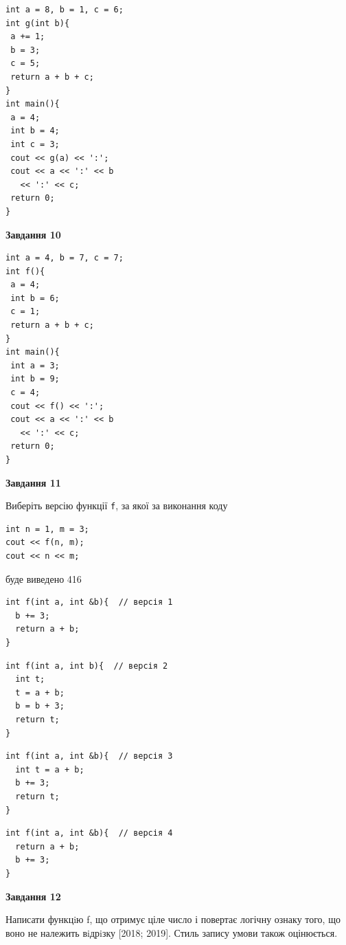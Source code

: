\documentclass[12pt, ukrainian]{article}
\def\code#1{\Verb!#1!}
\begin{document}
{\begin {large}
\begin{minipage}[t]{7.0cm}
\begin{verbatim}
int a = 8, b = 1, c = 6;
int g(int b){
 a += 1;
 b = 3;
 c = 5;
 return a + b + c;
}
int main(){
 a = 4;
 int b = 4;
 int c = 3;
 cout << g(a) << ':';
 cout << a << ':' << b 
   << ':' << c;
 return 0;
}
\end{verbatim}



\begin{center}
\textbf{Завдання 10}
\end{center}
\vspace{-8mm}

\begin{verbatim}
int a = 4, b = 7, c = 7;
int f(){
 a = 4;
 int b = 6;
 c = 1;
 return a + b + c;
}
int main(){
 int a = 3;
 int b = 9;
 c = 4;
 cout << f() << ':';
 cout << a << ':' << b 
   << ':' << c;
 return 0;
}
\end{verbatim}

\end{minipage}
\vline \hspace{1mm}
\begin{minipage}[t]{11.0cm}

\begin{center}
\textbf{Завдання 11}
\end{center}
Виберіть версію функції \code{f}, за якої за виконання коду
\begin{verbatim}
int n = 1, m = 3;
cout << f(n, m);
cout << n << m;
\end{verbatim}

буде виведено 416

\begin{verbatim}
int f(int a, int &b){  // версія 1
  b += 3;
  return a + b;
}
\end{verbatim}

\vspace{-8mm}\begin{verbatim}
int f(int a, int b){  // версія 2
  int t;
  t = a + b;
  b = b + 3;
  return t;
}
\end{verbatim}

\vspace{-8mm}\begin{verbatim}
int f(int a, int &b){  // версія 3
  int t = a + b;
  b += 3;
  return t;
}
\end{verbatim}

\vspace{-8mm}\begin{verbatim}
int f(int a, int &b){  // версія 4
  return a + b;
  b += 3;
}
\end{verbatim}



\begin{center}
\textbf{Завдання 12}
\end{center}

Написати функцiю f, що отримує ціле число і повертає логічну ознаку того, що воно не належить вiдрiзку [2018; 2019]. Стиль запису умови також оцінюється.\par

\end{minipage}

\end {large}}
\end{document}
